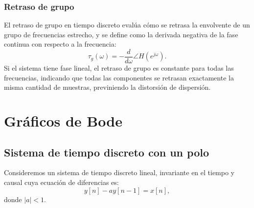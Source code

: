 \subsubsection{Retraso de grupo}

El retraso de grupo en tiempo discreto evalúa cómo se retrasa la envolvente de un grupo de frecuencias estrecho, y se define como la derivada negativa de la fase continua con respecto a la frecuencia:
\begin{equation}
	\tau_g(\omega) = -\frac{d}{d\omega} \angle H(e^{j\omega}).
\end{equation}
Si el sistema tiene fase lineal, el retraso de grupo es constante para todas las frecuencias, indicando que todas las componentes se retrasan exactamente la misma cantidad de muestras, previniendo la distorsión de dispersión.

\section{Gr\'{a}ficos de Bode}

\subsection{Sistema de tiempo discreto con un polo}

Consideremos un sistema de tiempo discreto lineal, invariante en el tiempo y causal cuya ecuaci\'{o}n de diferencias es:
\begin{equation}
	y[n] - a y[n-1] = x[n],
\end{equation}
donde $|a| < 1$.

